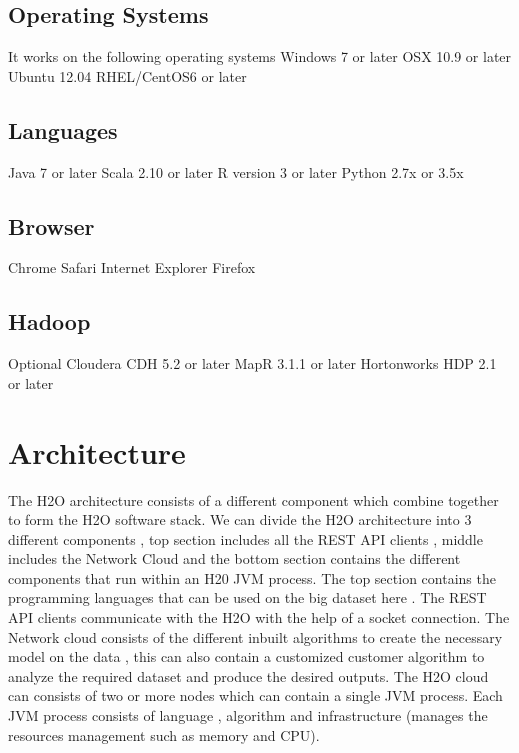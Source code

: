 \documentclass[9pt,twocolumn,twoside]{styles/osajnl}
\begin{document}
\subsection{Operating Systems}
It works on the following operating systems 
\newline Windows 7 or later
\newline OSX 10.9 or later
\newline Ubuntu 12.04
\newline RHEL/CentOS6 or later

\subsection{Languages}

 Java 7 or later
\newline Scala 2.10 or later
\newline R version 3 or later
\newline Python 2.7x or 3.5x
 
\subsection{Browser}

 Chrome
\newline Safari
\newline Internet Explorer
\newline Firefox

\subsection{Hadoop}
 Optional Cloudera CDH 5.2 or later
\newline MapR 3.1.1 or later
\newline Hortonworks HDP 2.1 or later

\section{Architecture}
\cite{www-h2o-architecture}
The H2O architecture consists of a different component which combine
together to form the H2O software stack. We can divide the H2O
architecture into 3 different components , top section includes all
the REST API clients , middle includes the Network Cloud and the
bottom section contains the different components that run within an
H20 JVM process.  The top section contains the programming languages
that can be used on the big dataset here . The REST API clients
communicate with the H2O with the help of a socket connection. The
Network cloud consists of the different inbuilt algorithms to create
the necessary model on the data , this can also contain a customized
customer algorithm to analyze the required dataset and produce the
desired outputs.  The H2O cloud can consists of two or more nodes
which can contain a single JVM process. Each JVM process consists of
language , algorithm and infrastructure (manages the resources
management such as memory and CPU).
\end{document}
